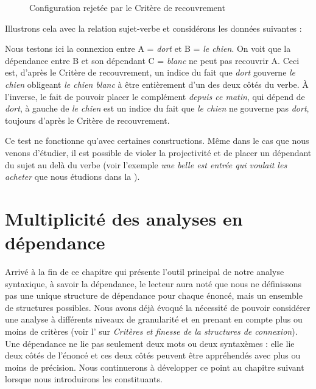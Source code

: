 \begin{figure}
\caption{\label{fig:recouvrement}Configuration rejetée par le Critère de recouvrement}
\end{figure}

\begin{sloppypar}
Illustrons cela avec la relation sujet-verbe et considérons les données suivantes :
\end{sloppypar}

\ea
  \z
\z

Nous testons ici la connexion entre A = \textit{dort} et B = \textit{le chien}. On voit que la dépendance entre B et son dépendant C = \textit{blanc} ne peut pas recouvrir A. Ceci est, d'après le Critère de recouvrement, un indice du fait que \textit{dort} gouverne \textit{le chien} obligeant \textit{le chien blanc} à être entièrement d’un des deux côtés du verbe. À l’inverse, le fait de pouvoir placer le complément \textit{depuis ce matin}, qui dépend de \textit{dort}, à gauche de \textit{le chien} est un indice du fait que \textit{le chien} ne gouverne pas \textit{dort}, toujours d'après le Critère de recouvrement.

Ce test ne fonctionne qu’avec certaines constructions. Même dans le cas que nous venons d’étudier, il est possible de violer la projectivité et de placer un dépendant du sujet au delà du verbe (voir l’exemple \textit{une belle est entrée qui voulait les acheter} que nous étudions dans la ).

\section{Multiplicité des analyses en dépendance}\label{sec:3.3.33}

Arrivé à la fin de ce chapitre qui présente l’outil principal de notre analyse syntaxique, à savoir la dépendance, le lecteur aura noté que nous ne définissons pas une unique structure de dépendance pour chaque énoncé, mais un ensemble de structures possibles. Nous avons déjà évoqué la nécessité de pouvoir considérer une analyse à {différents niveaux de granularité} et en prenant en compte plus ou moins de critères (voir l' sur \textit{Critères et finesse de la structures de connexion}). Une dépendance ne lie pas seulement deux mots ou deux syntaxèmes : elle lie deux côtés de l’énoncé et ces deux côtés peuvent être appréhendés avec plus ou moins de précision. Nous continuerons à développer ce point au chapitre suivant lorsque nous introduirons les constituants.

